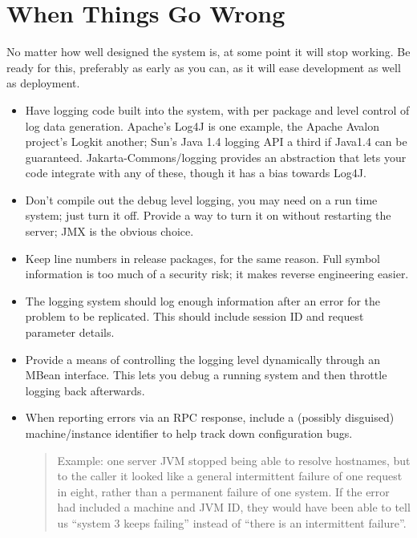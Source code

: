 \documentclass[draft]{report}
\begin{document}
\chapter{When Things Go Wrong}

No matter how well designed the system is, at some point it will stop
working. Be ready for this, preferably as early as you can, as it will
ease development as well as deployment.

\begin{itemize}

\item Have logging code built into the system, with per package and
level control of log data generation. Apache's Log4J is one example, the
Apache Avalon project's Logkit another; Sun's Java 1.4 logging API a
third if Java1.4 can be guaranteed. Jakarta-Commons/logging provides an
abstraction that lets your code integrate with any of these, though it
has a bias towards Log4J.

\item Don't compile out the debug level logging, you may need on a run
time system; just turn it off. Provide a way to turn it on without
restarting the server; JMX is the obvious choice.

\item Keep line numbers in release packages, for the same reason. Full
symbol information is too much of a security risk; it makes reverse
engineering easier.

\item The logging system should log enough information after an error
for the problem to be replicated. This should include session ID and
request parameter details.

\item Provide a means of controlling the logging level dynamically
through an MBean interface. This lets you debug a running system and
then throttle logging back afterwards.

\item When reporting errors via an RPC response, include a (possibly
disguised) machine/instance identifier to help track down configuration
bugs.

\begin{quotation} Example: one server JVM stopped being able to resolve
hostnames, but to the caller it looked like a general intermittent
failure of one request in eight, rather than a permanent failure of one
system. If the error had included a machine and JVM ID, they would have
been able to tell us ``system 3 keeps failing'' instead of ``there is an
intermittent failure''. \end{quotation}


\end{itemize}
\end{document}
